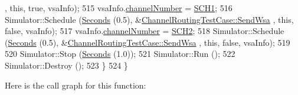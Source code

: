\begin{DoxyCode}
      , \textcolor{keyword}{this}, \textcolor{keyword}{true}, vsaInfo);
515     vsaInfo.\hyperlink{structns3_1_1VsaInfo_a72af25993c262cb6454afa073b0e1ab6}{channelNumber} = \hyperlink{channel-manager_8h_a456a1b730523e5d3b8a29fb227d10028}{SCH1};
516     Simulator::Schedule (\hyperlink{group__timecivil_ga33c34b816f8ff6628e33d5c8e9713b9e}{Seconds} (0.5), &\hyperlink{classChannelRoutingTestCase_a1489eb9505d13948307ce4119ba21cc9}{ChannelRoutingTestCase::SendWsa}
      , \textcolor{keyword}{this}, \textcolor{keyword}{false}, vsaInfo);
517     vsaInfo.\hyperlink{structns3_1_1VsaInfo_a72af25993c262cb6454afa073b0e1ab6}{channelNumber} = \hyperlink{channel-manager_8h_a07a0bff852fe2b8538a46d6e779546b6}{SCH2};
518     Simulator::Schedule (\hyperlink{group__timecivil_ga33c34b816f8ff6628e33d5c8e9713b9e}{Seconds} (0.5), &\hyperlink{classChannelRoutingTestCase_a1489eb9505d13948307ce4119ba21cc9}{ChannelRoutingTestCase::SendWsa}
      , \textcolor{keyword}{this}, \textcolor{keyword}{false}, vsaInfo);
519 
520     Simulator::Stop (\hyperlink{group__timecivil_ga33c34b816f8ff6628e33d5c8e9713b9e}{Seconds} (1.0));
521     Simulator::Run ();
522     Simulator::Destroy ();
523   \}
524 \}
\end{DoxyCode}


Here is the call graph for this function\+:



